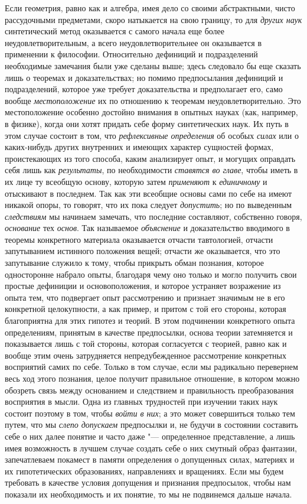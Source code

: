 {{Если геометрия, равно как и алгебра, имея дело со своими
абстрактными, чисто рассудочными предметами, скоро натыкается на свою
границу, то для {\em других наук}
синтетический метод оказывается с самого начала еще более
неудовлетворительным, а всего неудовлетворительнее он оказывается в
применении к философии. Относительно дефиниций и подразделений необходимые
замечания были уже сделаны выше; здесь следовало бы еще сказать лишь о
теоремах и доказательствах; но помимо предпосылания дефиниций и
подразделений, которое уже требует доказательства и предполагает его, само
вообще {\em местоположение}
их по отношению к теоремам неудовлетворительно. Это
местоположение особенно достойно внимания в опытных науках (как, например,
в физике), когда они хотят придать себе форму синтетических наук. Их путь в
этом случае состоит в том, что
{\em рефлексивные определения}
об особых {\em силах}
или о каких-нибудь других внутренних и имеющих характер
сущностей формах, проистекающих из того способа, каким анализирует опыт, и
могущих оправдать себя лишь как
{\em результаты}, по
необходимости {\em ставятся во главе},
чтобы иметь в их лице ту всеобщую основу, которую затем
{\em применяют} к
{\em единичному} и
отыскивают в последнем. Так как эти всеобщие основы сами по себе на имеют
никакой опоры, то говорят, что их пока следует
{\em допустить}; но по
выведенным {\em следствиям}
мы начинаем замечать, что последние составляют,
собственно говоря,
{\em основание} тех
{\em основ}. Так
называемое {\em объяснение}
и доказательство вводимого в теоремы конкретного материала
оказывается отчасти тавтологией, отчасти запутыванием истинного положения
вещей; отчасти же оказывается, что это запутывание служило к тому, чтобы
прикрыть обман познания, которое односторонне набрало опыты, благодаря чему
оно только и могло получить свои простые дефиниции и основоположения, и
которое устраняет возражение из опыта тем, что подвергает опыт рассмотрению
и признает значимым не в его конкретной целокупности, а как пример, и
притом с той его стороны, которая благоприятна для этих гипотез и теорий. В
этом подчинении конкретного опыта определениям, принятым в качестве
предпосылки, основа теории затемняется и показывается лишь с той стороны,
которая согласуется с теорией, равно как и вообще этим очень затрудняется
непредубежденное рассмотрение конкретных восприятий самих по себе. Только в
том случае, если мы радикально перевернем весь ход этого познания, целое
получит правильное отношение, в котором можно обозреть связь между
основанием и следствием и правильность преобразования восприятия в мысли.
Одна из главных трудностей при изучении таких наук состоит поэтому в том,
чтобы {\em войти в них};
а это может совершиться только тем путем, что мы
{\em слепо допускаем}
предпосылки и, не будучи в состоянии составить себе о них
далее понятие и часто даже "--- определенное представление, а
лишь имея возможность в лучшем случае создать себе о них смутный образ
фантазии, запечатлеваем покамест в памяти определения о допущенных силах,
материях и их гипотетических образованиях, направлениях и вращениях. Если
мы будем требовать в качестве условия допущения и признания предпосылок,
чтобы нам показали их необходимость и их понятие, то мы не подвинемся
дальше начала.

}}

